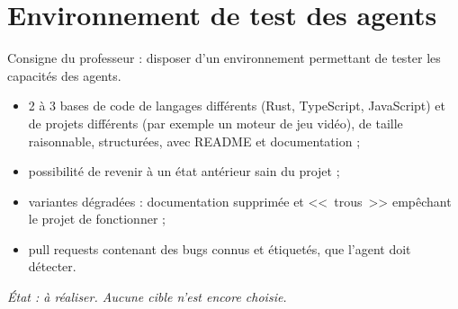 \section{Environnement de test des agents}
Consigne du professeur : disposer d'un environnement permettant de tester les capacit\'es des agents.

\begin{itemize}
  \item 2 \`a 3 bases de code de langages diff\'erents (Rust, TypeScript, JavaScript) et de projets diff\'erents (par exemple un moteur de jeu vid\'eo), de taille raisonnable, structur\'ees, avec README et documentation ;
  \item possibilit\'e de revenir \`a un \'etat ant\'erieur sain du projet ;
  \item variantes d\'egrad\'ees : documentation supprim\'ee et <<~trous~>> emp\^echant le projet de fonctionner ;
  \item pull requests contenant des bugs connus et \'etiquet\'es, que l'agent doit d\'etecter.
\end{itemize}

\emph{\'Etat : \`a r\'ealiser. Aucune cible n'est encore choisie.}
